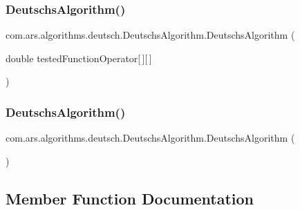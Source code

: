\subsubsection{\texorpdfstring{Deutschs\+Algorithm()}{DeutschsAlgorithm()}\hspace{0.1cm}{\footnotesize\ttfamily [1/2]}}
{\footnotesize\ttfamily com.\+ars.\+algorithms.\+deutsch.\+Deutschs\+Algorithm.\+Deutschs\+Algorithm (\begin{DoxyParamCaption}\item[{double}]{tested\+Function\+Operator\mbox{[}$\,$\mbox{]}\mbox{[}$\,$\mbox{]} }\end{DoxyParamCaption})}

\hypertarget{classcom_1_1ars_1_1algorithms_1_1deutsch_1_1_deutschs_algorithm_a2908de89b7f76d8160272af477a1dc42}{}\label{classcom_1_1ars_1_1algorithms_1_1deutsch_1_1_deutschs_algorithm_a2908de89b7f76d8160272af477a1dc42} 
\subsubsection{\texorpdfstring{Deutschs\+Algorithm()}{DeutschsAlgorithm()}\hspace{0.1cm}{\footnotesize\ttfamily [2/2]}}
{\footnotesize\ttfamily com.\+ars.\+algorithms.\+deutsch.\+Deutschs\+Algorithm.\+Deutschs\+Algorithm (\begin{DoxyParamCaption}{ }\end{DoxyParamCaption})}



\subsection{Member Function Documentation}
\hypertarget{classcom_1_1ars_1_1algorithms_1_1deutsch_1_1_deutschs_algorithm_a01537777ec24738faf83660313759ea4}{}\label{classcom_1_1ars_1_1algorithms_1_1deutsch_1_1_deutschs_algorithm_a01537777ec24738faf83660313759ea4} 
